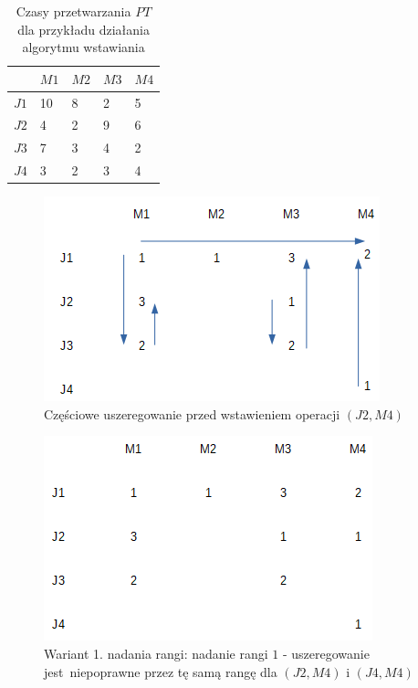 \documentclass[brudnopis]{xmgr}
\begin{document}
\begin{table}[!tbh]
\begin{tabular}{|l|l|l|l|l|} \hline
     & $M1$ & $M2$ & $M3$ & $M4$ \\ \hline
$J1$ & 10 & 8 & 2 & 5 \\ \hline
$J2$ & 4 & 2 & 9 & 6 \\ \hline
$J3$ & 7 & 3 & 4 & 2 \\ \hline
$J4$ & 3 & 2 & 3 & 4 \\ \hline
\end{tabular}
\caption{Czasy przetwarzania $PT$ dla przykładu działania algorytmu wstawiania\label{tab:example_pt}}
\end{table}\medskip

\begin{figure}[!tbh]
\centering
\includegraphics[width=.7\hsize]{fig/0.png}
\caption{Częściowe uszeregowanie przed wstawieniem operacji $(J2, M4)$\label{diag:state0}}
\end{figure}\medskip

\begin{figure}[!tbh]
\centering
\includegraphics[width=.7\hsize]{fig/1_0.png}
\caption{Wariant 1. nadania rangi: nadanie rangi $1$ - uszeregowanie jest~niepoprawne przez tę samą rangę dla $(J2, M4)$ i $(J4, M4)$\label{diag:state1_0}}
\end{figure}\medskip
\end{document}
